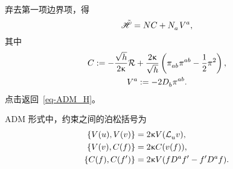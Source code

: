 \begin{Proof}
\begin{equation}
\begin{split}
				\end{split}
			\end{equation}
			弃去第一项边界项，得
			\begin{equation}
				\Had = N C + \tensor{N}{_a} \tensor{V}{^a},
			\end{equation}
			其中
			\begin{gather}
				C \definedby - \frac{\sqrt{h}}{2\gkappa} \spacecurR + \frac{2\gkappa}{\sqrt{h}} \left( \tensor{\pi}{_a_b} \tensor{\pi}{^a^b} - \frac{1}{2} \pi^2 \right),\\
				\tensor{V}{^a} \definedby -2 \spaceD{b} \tensor{\pi}{^a^b}.
			\end{gather}
			{\normalfont\ttfamily\color{green} 点击返回~\eqref{eq-ADM_H}。}
		\end{Proof}

		\begin{Property}
			ADM 形式中，约束之间的泊松括号为
			\begin{equation}
				\begin{split}
					\left\{ V({u}), V({v}) \right\} &= 2\gkappa V(\Ld{{u}} {v}),\\
					\left\{ V({v}), C(f) \right\} &= 2\gkappa C(v(f)),\\
					\left\{ C(f), C(f') \right\} &= 2\gkappa V(f\tensor{D}{^a}f'-f' \tensor{D}{^a}f).
				\end{split}
			\end{equation}
		\end{Property}

